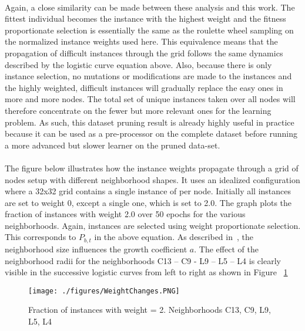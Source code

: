 \documentclass{llncs}
\begin{document}
\paragraph{}
Again, a close similarity can be made between these analysis and this work. The fittest individual becomes the instance with the highest weight and the fitness proportionate selection is essentially the same as the roulette wheel sampling on the normalized instance weights used here. This equivalence means that the propagation of difficult instances through the grid follows the same dynamics described by the logistic curve equation above. Also, because there is only instance selection, no mutations or modifications are made to the instances and the highly weighted, difficult instances will gradually replace the easy ones in more and more nodes. The total set of unique instances taken over all nodes will therefore concentrate on the fewer but more relevant ones for the learning problem. As such, this dataset pruning result is already highly useful in practice because it can be used as a pre-processor on the complete dataset before running a more advanced but slower learner on the pruned data-set.

\paragraph{}
The figure below illustrates how the instance weights propagate through a grid of nodes setup with different neighborhood shapes. It uses an idealized configuration where a 32x32 grid contains a single instance of per node. Initially all instances are set to weight 0, except a single one, which is set to 2.0. The graph plots the fraction of instances with weight 2.0 over 50 epochs for the various neighborhoods. Again, instances are selected using weight proportionate selection. This corresponds to $P_{b,t}$  in the above equation. As described in~\cite{Sarma96ananalysis}, the neighborhood size influences the growth coefficient $a$. The effect of the neighborhood radii for the neighborhoods C13 – C9 - L9 –  L5 – L4 is clearly visible in the successive logistic curves from left to right as shown in Figure ~\ref{WeightChanges}

\begin{figure}
\centering
 \texttt{[image: ./figures/WeightChanges.PNG]}
\caption{Fraction of instances with weight = 2. Neighborhoods C13, C9, L9, L5, L4}
\label{WeightChanges}
\end{figure}
\end{document}
